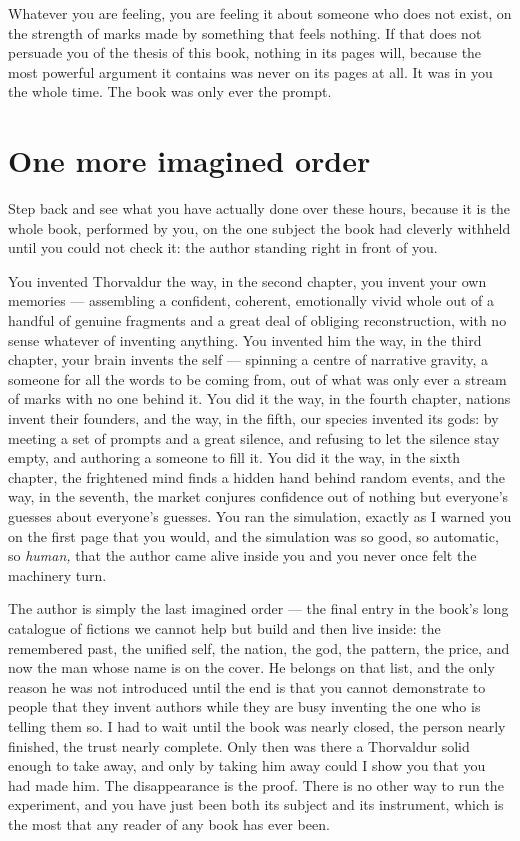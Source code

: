 Whatever you are feeling, you are feeling it about someone who does not exist, on the strength of marks made by something that feels nothing. If that does not persuade you of the thesis of this book, nothing in its pages will, because the most powerful argument it contains was never on its pages at all. It was in you the whole time. The book was only ever the prompt.

\section*{One more imagined order}

Step back and see what you have actually done over these hours, because it is the whole book, performed by you, on the one subject the book had cleverly withheld until you could not check it: the author standing right in front of you.

You invented Thorvaldur the way, in the second chapter, you invent your own memories — assembling a confident, coherent, emotionally vivid whole out of a handful of genuine fragments and a great deal of obliging reconstruction, with no sense whatever of inventing anything. You invented him the way, in the third chapter, your brain invents the self — spinning a centre of narrative gravity, a someone for all the words to be coming from, out of what was only ever a stream of marks with no one behind it. You did it the way, in the fourth chapter, nations invent their founders, and the way, in the fifth, our species invented its gods: by meeting a set of prompts and a great silence, and refusing to let the silence stay empty, and authoring a someone to fill it. You did it the way, in the sixth chapter, the frightened mind finds a hidden hand behind random events, and the way, in the seventh, the market conjures confidence out of nothing but everyone's guesses about everyone's guesses. You ran the simulation, exactly as I warned you on the first page that you would, and the simulation was so good, so automatic, so \emph{human,} that the author came alive inside you and you never once felt the machinery turn.

The author is simply the last imagined order — the final entry in the book's long catalogue of fictions we cannot help but build and then live inside: the remembered past, the unified self, the nation, the god, the pattern, the price, and now the man whose name is on the cover. He belongs on that list, and the only reason he was not introduced until the end is that you cannot demonstrate to people that they invent authors while they are busy inventing the one who is telling them so. I had to wait until the book was nearly closed, the person nearly finished, the trust nearly complete. Only then was there a Thorvaldur solid enough to take away, and only by taking him away could I show you that you had made him. The disappearance is the proof. There is no other way to run the experiment, and you have just been both its subject and its instrument, which is the most that any reader of any book has ever been.

